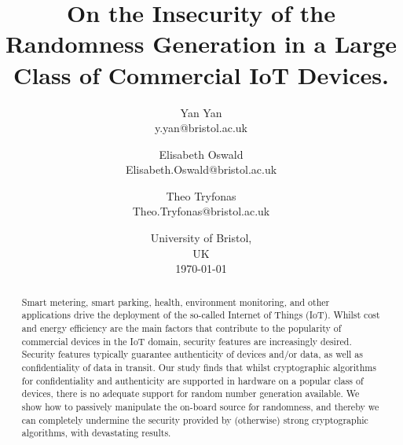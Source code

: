 \documentclass{article}
\title{On the Insecurity of the Randomness Generation in a Large Class of Commercial IoT Devices.}
\author{ 
Yan Yan \\ 
y.yan@bristol.ac.uk
\and
Elisabeth Oswald \\ 
Elisabeth.Oswald@bristol.ac.uk
\and
Theo Tryfonas \\ 
Theo.Tryfonas@bristol.ac.uk
}
\date{University of Bristol, \\ UK \\ \today}
\begin{document}
\maketitle

\begin{abstract}
Smart metering, smart parking, health, environment monitoring, and other applications drive the deployment of the so-called Internet of Things (IoT). Whilst cost and energy efficiency are the main factors that contribute to the popularity of commercial devices in the IoT domain, security features are increasingly desired. Security features typically guarantee authenticity of devices and/or data, as well as confidentiality of data in transit. Our study finds that whilst cryptographic algorithms for confidentiality and authenticity are supported in hardware on a popular class of devices, there is no adequate support for random number generation available. We show how to passively manipulate the on-board source for randomness, and thereby we can completely undermine the security provided by (otherwise) strong cryptographic algorithms, with devastating results. 
\end{abstract}








\appendix

\end{document}
